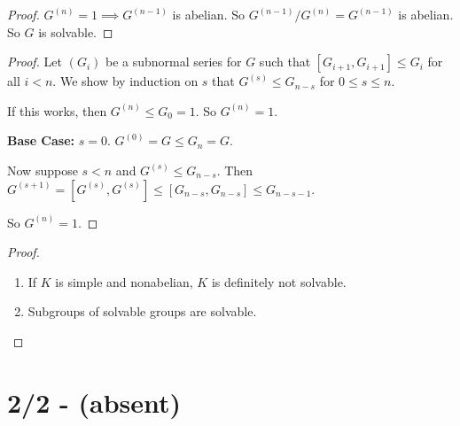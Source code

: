 \documentclass{report}
\begin{document}
\begin{proof}
    $G^{(n)} = 1 \implies G^{(n-1)}$ is abelian. So $G^{(n-1)} / G^{(n)} = G^{(n-1)}$ is abelian. So $G$ is solvable.
\end{proof}
\newpage
{}
\begin{proof}
    Let $(G_i)$ be a subnormal series for $G$ such that $[G_{i+1}, G_{i+1}] \leq G_i$ for all $i < n$. We show by induction on $s$ that $G^{(s)} \leq G_{n-s}$ for $0 \leq s \leq n$. 

    If this works, then $G^{(n)} \leq G_0 = 1$. So $G^{(n)} = 1$.

    \textbf{Base Case:} $s = 0$. $G^{(0)} = G \leq G_n = G$.

    Now suppose $s < n$ and $G^{(s)} \leq G_{n-s}$. Then $G^{(s+1)} = [G^{(s)}, G^{(s)}] \leq [G_{n-s}, G_{n-s}] \leq G_{n-s-1}$.

    So $G^{(n)} = 1$.
\end{proof}



\begin{proof}
    \begin{enumerate}[label=(\alph*)]
        \item If $K$ is simple and nonabelian, $K$ is definitely not solvable.
        \item Subgroups of solvable groups are solvable.
    \end{enumerate}
\end{proof}

\section{2/2 - (absent)}
\end{document}
